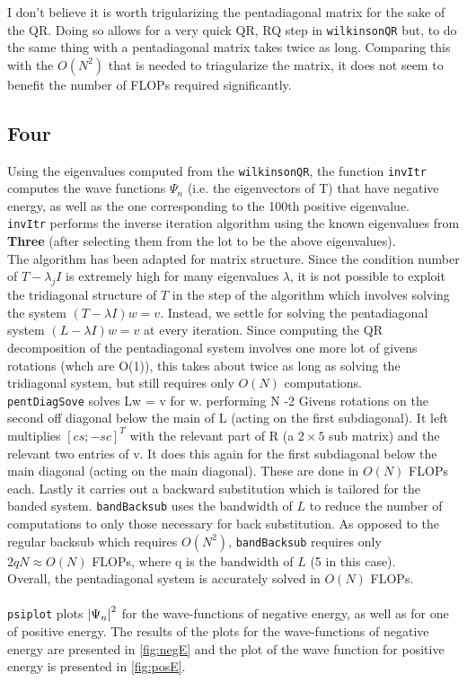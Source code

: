 \documentclass[paper=a4, fontsize=12pt]{scrartcl} %
\numberwithin{equation}{section}       %
\numberwithin{figure}{section}         %
\numberwithin{table}{section}          %
\begin{document}
I don't believe it is worth trigularizing the pentadiagonal matrix for the sake of the QR. Doing so allows for a very quick QR, RQ step in \texttt{wilkinsonQR} but, to do the same thing with a pentadiagonal matrix takes twice as long. Comparing this with the $O(N^2)$ that is needed to triagularize the matrix, it does not seem to benefit the number of FLOPs required significantly. 

\newpage

\subsection{Four}
Using the eigenvalues computed from the \texttt{wilkinsonQR}, the function \texttt{invItr} computes the wave functions $\Psi_n$ (i.e. the eigenvectors of T)  that have negative energy, as well as the one corresponding to the 100th positive eigenvalue. \\
\indent \texttt{invItr} performs the inverse iteration algorithm using the known eigenvalues from \textbf{Three} (after selecting them from the lot to be the above eigenvalues).\\
\indent The algorithm has been adapted for matrix structure. Since the condition number of $T - \lambda_j I$ is extremely high for many eigenvalues $\lambda$, it is not possible to exploit the tridiagonal structure of $T$ in the step of the algorithm which involves solving the system $(T - \lambda I)w = v$. Instead, we settle for solving the pentadiagonal system $(L - \lambda I)w = v$ at every iteration. Since computing the QR decomposition of the pentadiagonal system involves one more lot of givens rotations (whch are O(1)), this takes about twice as long as solving the tridiagonal system, but still requires only $O(N)$ computations. \\
\texttt{pentDiagSove} solves Lw = v for w. performing N -2 Givens rotations on the second off diagonal below the main of L (acting on the first subdiagonal). It left multiplies $[c s; -s c]^T$  with the relevant part of R (a $2\times 5$ sub matrix) and the relevant two entries of v. It does this again for the first subdiagonal below the main diagonal (acting on the main diagonal). These are done in $O(N)$ FLOPs each. Lastly it carries out a backward substitution which is tailored for the banded system. \texttt{bandBacksub} uses the bandwidth of $L$ to reduce the number of computations to only those necessary for back substitution. As opposed to the regular backsub which requires $O(N^2)$, \texttt{bandBacksub} requires only $2qN \approx O(N)$ FLOPs, where q is the bandwidth of $L$ (5 in this case).\\
Overall, the pentadiagonal system is accurately solved in $O(N)$ FLOPs. \\
\\
\texttt{psiplot} plots $\abs{\Psi_n}^2$ for the wave-functions of negative energy, as well as for one of positive energy. The results of the plots for the wave-functions of negative energy are presented in \ref{fig:negE} and the plot of the wave function for positive energy is presented in \ref{fig:posE}. 
\end{document}
